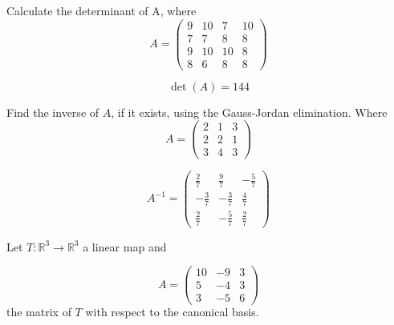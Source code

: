 \begin{questions}

\question Calculate the determinant of A, where
$$
A=\left(\begin{array}{rrrr}
9 & 10 & 7 & 10 \\
7 & 7 & 8 & 8 \\
9 & 10 & 10 & 8 \\
8 & 6 & 8 & 8
\end{array}\right)
$$

\begin{solution}
$$\det(A)=144$$
\end{solution}

\question Find the inverse of $A$, if it exists, using the Gauss-Jordan elimination. Where
$$
A=\left(\begin{array}{rrr}
2 & 1 & 3 \\
2 & 2 & 1 \\
3 & 4 & 3
\end{array}\right)
$$

\begin{solution}
$$A^{-1}=\left(\begin{array}{rrr}
\frac{2}{7} & \frac{9}{7} & -\frac{5}{7} \\
-\frac{3}{7} & -\frac{3}{7} & \frac{4}{7} \\
\frac{2}{7} & -\frac{5}{7} & \frac{2}{7}
\end{array}\right)$$
\end{solution}

\question Let $T:\mathbb{R}^3\rightarrow\mathbb{R}^3$  a linear map and
 
$$
A=\left(\begin{array}{rrr}
10 & -9 & 3 \\
5 & -4 & 3 \\
3 & -5 & 6
\end{array}\right)
$$
the matrix of $T$ with respect to the canonical basis.
\end{questions}

